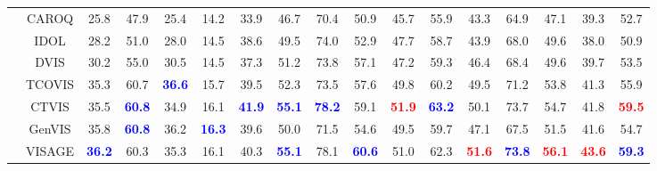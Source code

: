 \begin{table}[t!]
\begin{adjustbox}{max width = \textwidth}
\begin{tabular}{ccccccccccccccccc}
\multicolumn{1}{c|}{} & \multicolumn{1}{c|}{{CAROQ} \citep{Choudhuri_2023_CVPR}} & 25.8 & 47.9& 25.4& 14.2  & \multicolumn{1}{c|}{33.9} & 46.7 & 70.4& 50.9& 45.7  & \multicolumn{1}{c|}{55.9}& 43.3 & 64.9& 47.1& 39.3  & 52.7 \\
\multicolumn{1}{c|}{} & \multicolumn{1}{c|}{IDOL \citep{wu2022defense}} & 28.2 & 51.0& 28.0& 14.5  & \multicolumn{1}{c|}{38.6} & 49.5 & 74.0& 52.9& 47.7  & \multicolumn{1}{c|}{58.7}& 43.9 & 68.0& 49.6& 38.0  & 50.9\\
\multicolumn{1}{c|}{} & \multicolumn{1}{c|}{DVIS \citep{DVIS}} & 30.2 & 55.0& 30.5& 14.5  & \multicolumn{1}{c|}{37.3} & 51.2 & 73.8& 57.1& 47.2  & \multicolumn{1}{c|}{59.3}& 46.4 & 68.4& 49.6& 39.7  & 53.5\\
\multicolumn{1}{c|}{} & \multicolumn{1}{c|}{TCOVIS \citep{li2023tcovis}} & 35.3 & 60.7& \textbf{\textcolor{blue}{36.6}}& 15.7  & \multicolumn{1}{c|}{39.5}  & 52.3 & 73.5& 57.6& 49.8  & \multicolumn{1}{c|}{60.2}& 49.5 & 71.2& 53.8& 41.3  & 55.9\\
\multicolumn{1}{c|}{} & \multicolumn{1}{c|}{CTVIS \citep{ying2023ctvis}} & 35.5 & \textbf{\textcolor{blue}{60.8}}& 34.9& 16.1  & \multicolumn{1}{c|}{\textbf{\textcolor{blue}{41.9}}} & \textbf{\textcolor{blue}{55.1}} & \textbf{\textcolor{blue}{78.2}}& 59.1& \textbf{\textcolor{red}{51.9}}  & \multicolumn{1}{c|}{\textbf{\textcolor{blue}{63.2}}}& 50.1 & 73.7& 54.7& 41.8  & \textbf{\textcolor{red}{59.5}}\\
\multicolumn{1}{c|}{} & \multicolumn{1}{c|}{GenVIS \citep{heo2023generalized}} & 35.8 & \textbf{\textcolor{blue}{60.8}}& 36.2& \textbf{\textcolor{blue}{16.3}}  & \multicolumn{1}{c|}{39.6}  & 50.0 & 71.5& 54.6& 49.5  & \multicolumn{1}{c|}{59.7}& 47.1 & 67.5& 51.5& 41.6  & 54.7\\
\multicolumn{1}{c|}{} & \multicolumn{1}{c|}{{VISAGE} \citep{kim2025visage}} & \textbf{\textcolor{blue}{36.2}} & 60.3& 35.3& 16.1  & \multicolumn{1}{c|}{40.3}  & \textbf{\textcolor{blue}{55.1}} & 78.1& \textbf{\textcolor{blue}{60.6}}& 51.0  & \multicolumn{1}{c|}{62.3}& \textbf{\textcolor{red}{51.6}} & \textbf{\textcolor{blue}{73.8}}& \textbf{\textcolor{red}{56.1}}& \textbf{\textcolor{red}{43.6}}  & \textbf{\textcolor{blue}{59.3}}\\




\end{tabular}
\end{adjustbox}
\end{table}
